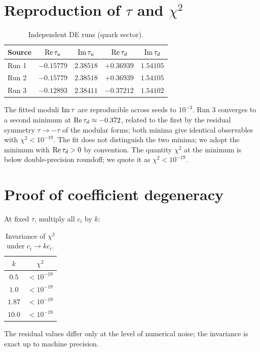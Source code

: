 \documentclass[12pt,a4paper]{article}
\numberwithin{equation}{section}
\begin{document}
\section{Reproduction of \(\tau\) and \(\chi^2\)}
\begin{table}[H]
\centering
\caption{Independent DE runs (quark sector).}
\begin{tabular}{lcccc}
\toprule
Source & \({\rm Re}\,\tau_u\) & \({\rm Im}\,\tau_u\) & \({\rm Re}\,\tau_d\) & \({\rm Im}\,\tau_d\) \\
\midrule
Run 1 & \(-0.15779\) & \(2.38518\) & \(+0.36939\) & \(1.54105\) \\
Run 2 & \(-0.15779\) & \(2.38518\) & \(+0.36939\) & \(1.54105\) \\
Run 3 & \(-0.12893\) & \(2.38411\) & \(-0.37212\) & \(1.54102\) \\
\bottomrule
\end{tabular}
\end{table}
The fitted moduli \({\rm Im}\,\tau\) are reproducible across seeds to \(10^{-3}\). Run 3 converges to a second minimum at \({\rm Re}\,\tau_d \approx -0.372\), related to the first by the residual symmetry \(\tau \to -\tau\) of the modular forms; both minima give identical observables with \(\chi^2 < 10^{-19}\). The fit does not distinguish the two minima; we adopt the minimum with \({\rm Re}\,\tau_d > 0\) by convention. The quantity \(\chi^2\) at the minimum is below double-precision roundoff; we quote it as \(\chi^2<10^{-19}\).

\section{Proof of coefficient degeneracy}
At fixed \(\tau\), multiply all \(c_i\) by \(k\):
\begin{table}[H]
\centering
\caption{Invariance of \(\chi^2\) under \(c_i\to kc_i\).}
\begin{tabular}{cc}
\toprule
\(k\) & \(\chi^2\) \\
\midrule
\(0.5\)  & \(< 10^{-19}\) \\
\(1.0\)  & \(< 10^{-19}\) \\
\(1.87\) & \(< 10^{-19}\) \\
\(10.0\) & \(< 10^{-19}\) \\
\bottomrule
\end{tabular}
\end{table}
The residual values differ only at the level of numerical noise; the invariance is exact up to machine precision.
\end{document}

